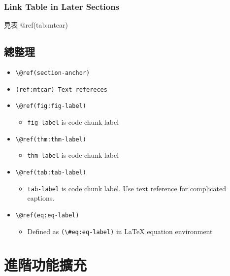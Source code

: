 \documentclass[oneside]{book}
\providecommand{\tightlist}{%
  \setlength{\itemsep}{0pt}\setlength{\parskip}{0pt}}
\begin{document}
\hypertarget{link-table-in-later-sections-1}{%
\subsection*{Link Table in Later Sections}\label{link-table-in-later-sections-1}}

見表 @ref(tab:mtcar)

\hypertarget{ux7e3dux6574ux7406-1}{%
\section{總整理}\label{ux7e3dux6574ux7406-1}}

\begin{itemize}
\tightlist
\item
  \texttt{\textbackslash{}@ref(section-anchor)}
\item
  \texttt{(ref:mtcar)\ Text\ refereces}
\item
  \texttt{\textbackslash{}@ref(fig:fig-label)}

  \begin{itemize}
  \tightlist
  \item
    \texttt{fig-label} is code chunk label
  \end{itemize}
\item
  \texttt{\textbackslash{}@ref(thm:thm-label)}

  \begin{itemize}
  \tightlist
  \item
    \texttt{thm-label} is code chunk label
  \end{itemize}
\item
  \texttt{\textbackslash{}@ref(tab:tab-label)}

  \begin{itemize}
  \tightlist
  \item
    \texttt{tab-label} is code chunk label. Use text reference for complicated captions.
  \end{itemize}
\item
  \texttt{\textbackslash{}@ref(eq:eq-label)}

  \begin{itemize}
  \tightlist
  \item
    Defined as \texttt{(\textbackslash{}\#eq:eq-label)} in LaTeX equation environment
  \end{itemize}
\end{itemize}

\hypertarget{add-on}{%
\chapter{進階功能擴充}\label{add-on}}
\end{document}
